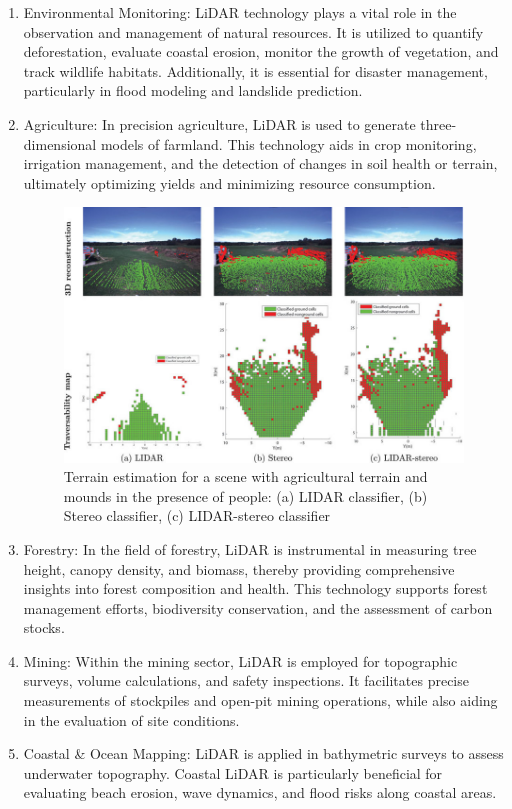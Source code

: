 \documentclass{article}
\begin{document}
\begin{enumerate}
    \item  Environmental Monitoring: LiDAR technology plays a vital role in the observation and management of natural resources. It is utilized to quantify deforestation, evaluate coastal erosion, monitor the growth of vegetation, and track wildlife habitats. Additionally, it is essential for disaster management, particularly in flood modeling and landslide prediction.\cite{Weibring:03}
    \item Agriculture: In precision agriculture, LiDAR is used to generate three-dimensional models of farmland. This technology aids in crop monitoring, irrigation management, and the detection of changes in soil health or terrain, ultimately optimizing yields and minimizing resource consumption.\cite{RIVERA2023107737}
    \begin{figure}[h!]
    \centering
    \includegraphics[width=1\textwidth]{lidaragri.jpg}
    \caption{\label{fig:xrd}Terrain estimation for a scene with agricultural terrain and mounds in the presence of people: (a) LIDAR classifier, (b) Stereo classifier, (c) LIDAR-stereo classifier\cite{Annalisa}}
    \end{figure}
    \item Forestry: In the field of forestry, LiDAR is instrumental in measuring tree height, canopy density, and biomass, thereby providing comprehensive insights into forest composition and health. This technology supports forest management efforts, biodiversity conservation, and the assessment of carbon stocks.\cite{MICHEZ2016331}
    \item Mining: Within the mining sector, LiDAR is employed for topographic surveys, volume calculations, and safety inspections. It facilitates precise measurements of stockpiles and open-pit mining operations, while also aiding in the evaluation of site conditions.\cite{Meaka}
    \item Coastal \& Ocean Mapping: LiDAR is applied in bathymetric surveys to assess underwater topography. Coastal LiDAR is particularly beneficial for evaluating beach erosion, wave dynamics, and flood risks along coastal areas.\cite{Sachak}
    

    
\end{enumerate}



\end{document}
